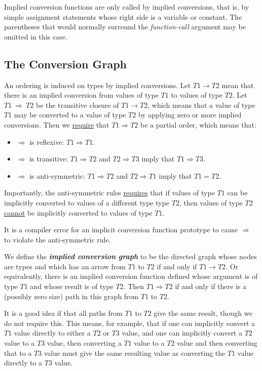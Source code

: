 \documentclass[12pt]{article}
\newcommand{\key}[1]{{\bf \em #1}\index{#1}}
\newcommand{\CNV}{\longrightarrow}	%
\newcommand{\TCNV}{\Longrightarrow}	%
\begin{document}
Implied conversion functions are only called by implied conversions, that
is, by simple assignment statements whose right side is
a variable or constant.  The parentheses that would normally
surround the {\em function-call} argument may be omitted
in this case.

\subsection{The Conversion Graph}
\label{THE-CONVERSION-GRAPH}

An ordering is induced on types by implied conversions.  Let
$T1\CNV T2$ mean that there is an implied conversion from
values of type $T1$ to values of type $T2$.  Let $T1~\TCNV~T2$
be the transitive closure of $T1\CNV T2$, which means
that a value of type $T1$ may be converted to a value
of type $T2$ by applying zero or more implied conversions.
Then we \underline{require}
that $T1\TCNV T2$ be a partial order, which means that:
\begin{itemize}
\item $\TCNV$ is reflexive: $T1\TCNV T1$.
\item $\TCNV$ is transitive: $T1\TCNV T2$ and $T2\TCNV T3$
imply that $T1\TCNV T3$.
\item $\TCNV$ is anti-symmetric:
$T1\TCNV T2$ and $T2\TCNV T1$
imply that $T1 = T2$.
\end{itemize}

Importantly, the anti-symmetric rules \underline{requires} that
if values of type $T1$ can be implicitly converted to
values of a different type type $T2$, then values of type $T2$
\underline{cannot} be implicitly converted to values of type $T1$.

It is a compiler error for an implicit conversion function
prototype to cause $\TCNV$ to violate the anti-symmetric rule.

We define the \key{implied conversion graph} to be the directed
graph whose nodes are types and which has an arrow from $T1$ to
$T2$ if and only if $T1\CNV T2$.
Or equivalently, there is an implied conversion function defined
whose argument is of type $T1$ and whose result is of type $T2$.
Then $T1\TCNV T2$ if and only if there is a (possibly zero size)
path in this graph from $T1$ to $T2$.

It is a good idea if that all paths
from $T1$ to $T2$ give the same result, though we do not require
this.
This means, for example, that
if one can implicitly convert a $T1$ value directly to
either a $T2$ or $T3$ value, and one can implicitly convert
a $T2$ value to a $T3$ value, then converting a $T1$ value
to a $T2$ value and then converting that to a $T3$ value
must give the same resulting value as converting the $T1$ value
directly to a $T3$ value.
\end{document}
